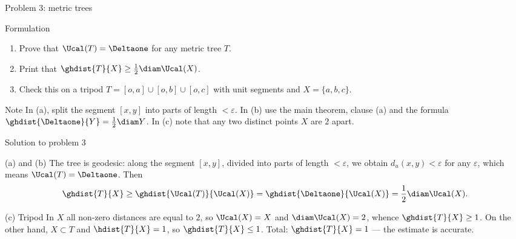 \documentclass[aspectratio=169,11pt]{beamer}
\begin{document}
\begin{frame}{Problem \textup{3}: metric trees}
\begin{block}{Formulation}
\begin{enumerate}
\item[(a)] Prove that $\Ucal(T) = \Deltaone$ for any metric tree $T$.
\item[(b)] Print that $\ghdist{T}{X} \ge \frac12 \diam\Ucal(X)$.
\item[(c)] Check this on a tripod $T = [o,a] \cup [o,b] \cup [o,c]$ with unit segments and $X = \{a,b,c\}$.
\end{enumerate}
\end{block}
\begin{block}{Note}
In \textup{(a)}, split the segment $[x,y]$ into parts of length $< \varepsilon$. In \textup{(b)} use the main theorem, clause \textup{(a)} and the formula $\ghdist{\Deltaone}{Y} = \frac12\diam Y$. In \textup{(c)} note that any two distinct points $X$ are $2$ apart.
\end{block}
\end{frame}

\begin{frame}{Solution to problem \textup{3}}
\begin{block}{\textup{(a)} and \textup{(b)}}
The tree is geodesic\textup{:} along the segment $[x,y]$, divided into parts of length $< \varepsilon$, we obtain $d_u(x,y) < \varepsilon$ for any $\varepsilon$, which means $\Ucal(T) = \Deltaone$. Then
\[
\ghdist{T}{X} \ge \ghdist{\Ucal(T)}{\Ucal(X)} = \ghdist{\Deltaone}{\Ucal(X)} = \frac12 \diam\Ucal(X).
\]
\end{block}
\begin{block}{\textup{(c)} Tripod}
In $X$ all non-zero distances are equal to $2$, so $\Ucal(X) = X$ and $\diam\Ucal(X) = 2$, whence $\ghdist{T}{X} \ge 1$. On the other hand, $X \subset T$ and $\hdist{T}{X} = 1$, so $\ghdist{T}{X} \le 1$. Total\textup{:} $\ghdist{T}{X} = 1$ --- the estimate is accurate.
\end{block}
\end{frame}
\end{document}
